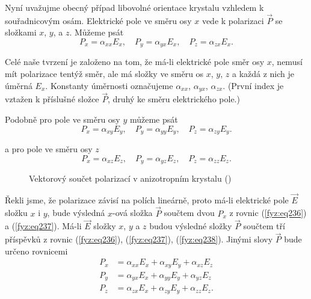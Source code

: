     Nyní uvažujme obecný případ libovolné orientace krystalu vzhledem k souřadnicovým osám.
    Elektrické pole ve směru osy \(x\) vede k polarizaci \(\vec{P}\) se složkami \(x\), \(y\), a
    \(z\). Můžeme psát
    \begin{equation}\label{fyz:eq236}
      P_x = \alpha_{xx}E_x, \quad P_y = \alpha_{yx}E_x, \quad  P_z = \alpha_{zx}E_x.
    \end{equation}

    Celé naše tvrzení je založeno na tom, že má-li elektrické pole směr osy \(x\), nemusí mít
    polarizace tentýž směr, ale má složky ve směru os \(x\), \(y\), \(z\) a každá z nich je úměrná
    \(E_x\). Konstanty úměrnosti označujeme \(\alpha_{xx}\), \(\alpha_{yx}\), \(\alpha_{zx}\).
    (První index je vztažen k příslušné složce \(\vec{P}\), druhý ke směru elektrického pole.) 
    
    Podobně pro pole ve směru osy \(y\) můžeme psát
    \begin{equation}\label{fyz:eq237}
      P_x = \alpha_{xy}E_y, \quad P_y = \alpha_{yy}E_y, \quad  P_z = \alpha_{zy}E_y.
    \end{equation}

    a pro pole ve směru osy \(z\)
    \begin{equation}\label{fyz:eq238}
      P_x = \alpha_{xz}E_z, \quad P_y = \alpha_{yz}E_z, \quad  P_z = \alpha_{zz}E_z.
    \end{equation}

    \begin{figure}[ht!]   %
      \centering
      \caption{Vektorový součet polarizací v anizotropním krystalu (\cite[s.~748]{Feynman02})}
      \label{fyz:fig874}
    \end{figure}

    Řekli jsme, že polarizace závisí na polích lineárně, proto má-li elektrické pole \(\vec{E}\)
    složku \(x\) i \(y\), bude výsledná \(x\)-ová složka \(\vec{P}\) součtem dvou \(P_x\) z rovnic
    (\ref{fyz:eq236}) a (\ref{fyz:eq237}). Má-li \(\vec{E}\) složky \(x\), \(y\) a \(z\) budou
    výsledné složky \(\vec{P}\) součtem tří příspěvků z rovnic (\ref{fyz:eq236}),
    (\ref{fyz:eq237}), (\ref{fyz:eq238}). Jinými slovy \(\vec{P}\) bude určeno rovnicemi
    \begin{align}\label{fyz:eq240}
      P_x &= \alpha_{xx}E_x + \alpha_{xy}E_y + \alpha_{xz}E_z  \nonumber \\
      P_y &= \alpha_{yx}E_x + \alpha_{yy}E_y + \alpha_{yz}E_z            \\
      P_z &= \alpha_{zx}E_x + \alpha_{zy}E_y + \alpha_{zz}E_z. \nonumber
    \end{align}

